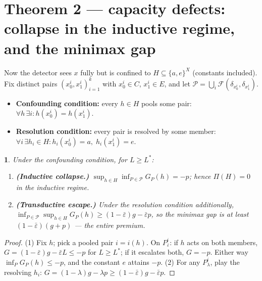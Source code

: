 \documentclass[11pt]{article}
\theoremstyle{plain}
\newtheorem*{namedthminner}{\namedthmname}
\newenvironment{nthm}[1]{\def\namedthmname{#1}\begin{namedthminner}}{\end{namedthminner}}
\theoremstyle{definition}
\begin{document}
\section{Theorem 2 --- capacity defects: collapse in the inductive regime, and the minimax gap}\label{app:thm2}

Now the detector sees $x$ fully but is confined to
$H \subseteq \{a,e\}^X$ (constants included). Fix distinct pairs
$(x_0^i, x_1^i)_{i=1}^k$ with $x_0^i \in C$, $x_1^i \in E$, and let
$\mathcal{P} = \bigcup_i \mathcal{F}(\delta_{x_0^i}, \delta_{x_1^i})$.

\begin{itemize}
\item \textbf{Confounding condition:} every $h \in H$ pools some pair:
  $\forall h\, \exists i : h(x_0^i) = h(x_1^i)$.
\item \textbf{Resolution condition:} every pair is resolved by some member:
  $\forall i\, \exists h_i \in H : h_i(x_0^i) = a,\; h_i(x_1^i) = e$.
\end{itemize}

\begin{nthm}{Theorem 2}
Under the confounding condition, for $L \geq L^*$:
\begin{enumerate}
\item \textbf{(Inductive collapse.)} $\displaystyle \sup_{h \in H} \inf_{P \in \mathcal{P}} G_P(h) = -p$; hence $\Pi(H) = 0$ in the inductive regime.
\item \textbf{(Transductive escape.)} Under the resolution condition additionally,
   $\displaystyle \inf_{P \in \mathcal{P}} \sup_{h \in H} G_P(h) \geq (1-\bar\varepsilon)g - \bar\varepsilon p$, so the minimax gap is at least $(1-\bar\varepsilon)(g+p)$ --- the entire premium.
\end{enumerate}
\end{nthm}

\begin{proof}
(1) Fix $h$; pick a pooled pair $i = i(h)$. On
$P^i_{\bar\varepsilon}$: if $h$ acts on both members,
$G = (1-\bar\varepsilon)g - \bar\varepsilon L \leq -p$ for $L \geq L^*$; if
it escalates both, $G = -p$. Either way
$\inf_P G_P(h) \leq -p$, and the constant $e$ attains $-p$. (2) For any
$P^i_\lambda$, play the resolving $h_i$:
$G = (1-\lambda)g - \lambda p \geq (1-\bar\varepsilon)g - \bar\varepsilon p$.
\end{proof}
\end{document}
